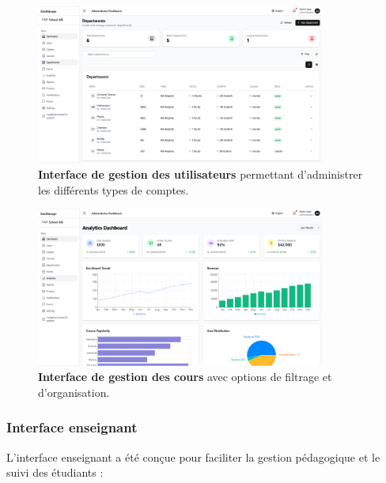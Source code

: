 \begin{figure}[H]
  \centering
  \includegraphics[width=0.85\textwidth,keepaspectratio]{pfe-pics/admin/Screenshot 2025-06-09 at 22-39-15 Vite React TS.png}
  \caption{\textbf{Interface de gestion des utilisateurs} permettant d'administrer les différents types de comptes.}
  \label{fig:user_management}
\end{figure}

\begin{figure}[H]
  \centering
  \includegraphics[width=0.85\textwidth,keepaspectratio]{pfe-pics/admin/Screenshot 2025-06-09 at 22-40-11 Vite React TS.png}
  \caption{\textbf{Interface de gestion des cours} avec options de filtrage et d'organisation.}
  \label{fig:course_management_admin}
\end{figure}

\subsubsection{Interface enseignant}

L'interface enseignant a été conçue pour faciliter la gestion pédagogique et le suivi des étudiants :

